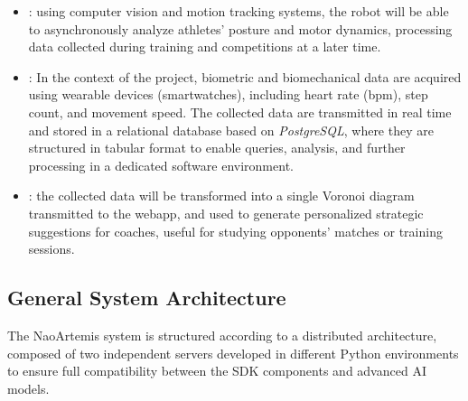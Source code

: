 \documentclass{optica-article}
\begin{document}
\begin{itemize}
    \item {}: using computer vision and motion tracking systems, the robot will be able to asynchronously analyze athletes' posture and motor dynamics, processing data collected during training and competitions at a later time.

    \item{}:
    In the context of the project, biometric and biomechanical data are acquired using wearable devices (smartwatches), including heart rate (bpm), step count, and movement speed. The collected data are transmitted in real time and stored in a relational database based on \textit{PostgreSQL}, where they are structured in tabular format to enable queries, analysis, and further processing in a dedicated software environment.

    \item {}: the collected data will be transformed into a single Voronoi diagram transmitted to the webapp, and used to generate personalized strategic suggestions for coaches, useful for studying opponents' matches or training sessions.
\end{itemize}

\subsection{General System Architecture}
The NaoArtemis system is structured according to a distributed architecture, composed of two independent servers developed in different Python environments to ensure full compatibility between the SDK components and advanced AI models.
\end{document}
